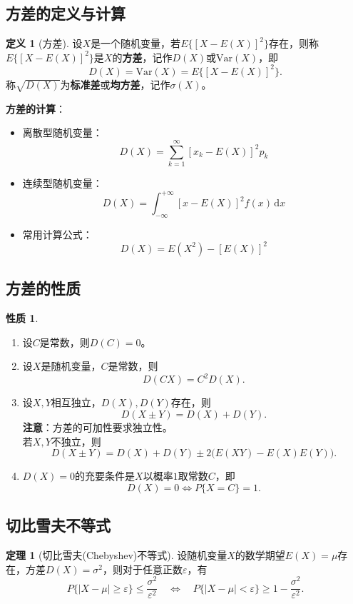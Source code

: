 \documentclass[11pt,a4paper]{report}
\theoremstyle{definition}
\newtheorem{definition}{定义}[chapter]
\newtheorem{theorem}{定理}[chapter]
\newtheorem{property}{性质}[chapter]
\theoremstyle{plain}
\begin{document}
\subsection{方差的定义与计算}

\begin{definition}[方差]
设$X$是一个随机变量，若$E\{[X-E(X)]^2\}$存在，则称$E\{[X-E(X)]^2\}$是$X$的\textbf{方差}，记作$D(X)$或$\mathrm{Var}(X)$，即
\[
D(X)=\mathrm{Var}(X)=E\big\{[X-E(X)]^2\big\}.
\]
称$\sqrt{D(X)}$为\textbf{标准差}或\textbf{均方差}，记作$\sigma(X)$。
\end{definition}

\textbf{方差的计算}：
\begin{itemize}[leftmargin=2em]
    \item 离散型随机变量：
    \[
    D(X)=\sum_{k=1}^{\infty}[x_k-E(X)]^2 p_k
    \]
    \item 连续型随机变量：
    \[
    D(X)=\int_{-\infty}^{+\infty}[x-E(X)]^2 f(x)\,\mathrm{d}x
    \]
    \item 常用计算公式：
    \[
    D(X)=E(X^2)-[E(X)]^2
    \]
\end{itemize}

\subsection{方差的性质}

\begin{property}
\begin{enumerate}[label=\arabic*.,leftmargin=2em]
    \item 设$C$是常数，则$D(C)=0$。
    \item 设$X$是随机变量，$C$是常数，则
    \[
    D(CX)=C^2 D(X).
    \]
    \item 设$X,Y$相互独立，$D(X),D(Y)$存在，则
    \[
    D(X\pm Y)=D(X)+D(Y).
    \]
    \textbf{注意}：方差的可加性要求独立性。\\
    若$X,Y$不独立，则
    \[
    D(X\pm Y)=D(X)+D(Y)\pm 2\big(E(XY)-E(X)E(Y)\big).
    \]
    \item $D(X)=0$的充要条件是$X$以概率$1$取常数$C$，即
    \[
    D(X)=0\iff P\{X=C\}=1.
    \]
\end{enumerate}
\end{property}

\subsection{切比雪夫不等式}

\begin{theorem}[切比雪夫(Chebyshev)不等式]
设随机变量$X$的数学期望$E(X)=\mu$存在，方差$D(X)=\sigma^2$，则对于任意正数$\varepsilon$，有
\[
P\{|X-\mu|\geq\varepsilon\}\leq\frac{\sigma^2}{\varepsilon^2}
\quad\Longleftrightarrow\quad
P\{|X-\mu|<\varepsilon\}\geq 1-\frac{\sigma^2}{\varepsilon^2}.
\]
\end{theorem}
\end{document}
